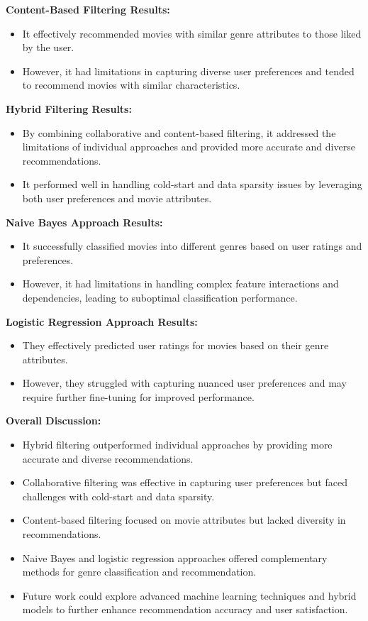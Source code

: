 \documentclass[a4paper]{article}
\theoremstyle{plain}
\theoremstyle{definition}
\begin{document}
        \textbf{Content-Based Filtering Results:}
        \begin{itemize}
            \item It effectively recommended movies with similar genre attributes to those liked by the user.
            \item However, it had limitations in capturing diverse user preferences and tended to recommend movies with similar characteristics.
        \end{itemize}

        \textbf{Hybrid Filtering Results:}
        \begin{itemize}
            \item By combining collaborative and content-based filtering, it addressed the limitations of individual approaches and provided more accurate and diverse recommendations.
            \item It performed well in handling cold-start and data sparsity issues by leveraging both user preferences and movie attributes.
        \end{itemize}

        \textbf{Naive Bayes Approach Results:}
        \begin{itemize}
            \item It successfully classified movies into different genres based on user ratings and preferences.
            \item However, it had limitations in handling complex feature interactions and dependencies, leading to suboptimal classification performance.
        \end{itemize}

        \textbf{Logistic Regression Approach Results:}
        \begin{itemize}
            \item They effectively predicted user ratings for movies based on their genre attributes.
            \item However, they struggled with capturing nuanced user preferences and may require further fine-tuning for improved performance.
        \end{itemize}

        \textbf{Overall Discussion:}
        \begin{itemize}
            \item Hybrid filtering outperformed individual approaches by providing more accurate and diverse recommendations.
            \item Collaborative filtering was effective in capturing user preferences but faced challenges with cold-start and data sparsity.
            \item Content-based filtering focused on movie attributes but lacked diversity in recommendations.
            \item Naive Bayes and logistic regression approaches offered complementary methods for genre classification and recommendation.
            \item Future work could explore advanced machine learning techniques and hybrid models to further enhance recommendation accuracy and user satisfaction.
        \end{itemize}
\end{document}
